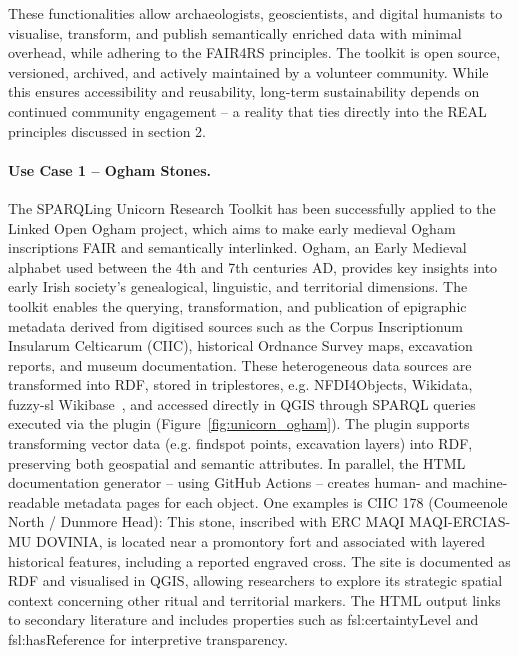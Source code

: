 \documentclass{eceasst}
\begin{document}
These functionalities allow archaeologists, geoscientists, and digital humanists to visualise, transform, and publish semantically enriched data with minimal overhead, while adhering to the FAIR4RS principles. The toolkit is open source, versioned, archived, and actively maintained by a volunteer community. While this ensures accessibility and reusability, long-term sustainability depends on continued community engagement – a reality that ties directly into the REAL principles discussed in section 2.

\paragraph{Use Case 1 – Ogham Stones.} The SPARQLing Unicorn Research Toolkit has been successfully applied to the Linked Open Ogham project, which aims to make early medieval Ogham inscriptions FAIR and semantically interlinked. Ogham, an Early Medieval alphabet used between the 4th and 7th centuries AD, provides key insights into early Irish society's genealogical, linguistic, and territorial dimensions. The toolkit enables the querying, transformation, and publication of epigraphic metadata derived from digitised sources such as the Corpus Inscriptionum Insularum Celticarum (CIIC), historical Ordnance Survey maps, excavation reports, and museum documentation. These heterogeneous data sources are transformed into RDF, stored in triplestores, e.g. NFDI4Objects, Wikidata, fuzzy-sl Wikibase~\cite{thiery_linked_2023}, and accessed directly in QGIS through SPARQL queries executed via the plugin (Figure~\ref{fig:unicorn_ogham}). The plugin supports transforming vector data (e.g. findspot points, excavation layers) into RDF, preserving both geospatial and semantic attributes. In parallel, the HTML documentation generator – using GitHub Actions – creates human- and machine-readable metadata pages for each object. One examples is CIIC 178 (Coumeenole North / Dunmore Head): This stone, inscribed with ERC MAQI MAQI-ERCIAS-MU DOVINIA, is located near a promontory fort and associated with layered historical features, including a reported engraved cross. The site is documented as RDF and visualised in QGIS, allowing researchers to explore its strategic spatial context concerning other ritual and territorial markers. The HTML output links to secondary literature and includes properties such as fsl:certaintyLevel and fsl:hasReference for interpretive transparency.
\end{document}
